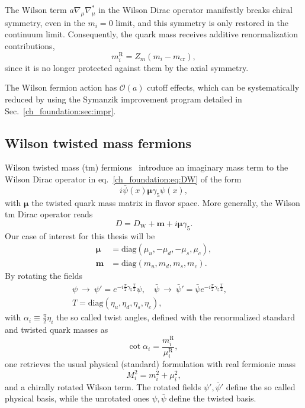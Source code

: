 The Wilson term $a\nabla_{\mu}\nabla_{\mu}^*$ in the Wilson Dirac operator manifestly breaks chiral symmetry, even in the $m_i=0$ limit, and this symmetry is only restored in the continuum limit. Consequently, the quark mass receives additive renormalization contributions, 
\begin{equation}
m_i^{\textrm{R}}=Z_m\left(m_i-m_{\textrm{cr}}\right),
\end{equation}
since it is no longer protected against them by the axial symmetry.

The Wilson fermion action has $\mathcal{O}(a)$ cutoff effects, which can be systematically reduced by using the Symanzik improvement program detailed in Sec.~\ref{ch_foundation:sec:impr}.


\subsection{Wilson twisted mass fermions}
\label{ch_foundation:subsec:tm}

Wilson twisted mass (tm) fermions~\citep{Frezzotti:1999vv,Frezzotti:2000nk,Frezzotti:2001ea,Frezzotti:2003ni,Shindler:2007vp} introduce an imaginary mass term to the Wilson Dirac operator in eq.~\eqref{ch_foundation:eq:DW} of the form
\begin{equation}
i\bar{\psi}(x)\boldsymbol{\mu}\gamma_5\psi(x),
\end{equation}
with $\boldsymbol{\mu}$ the twisted quark mass matrix in flavor space. More generally, the Wilson tm Dirac operator reads
\begin{equation}
D=D_{\textrm{W}}+\boldsymbol{m}+i\boldsymbol{\mu}\gamma_5.
\end{equation}
Our case of interest for this thesis will be
\begin{align}
\boldsymbol{\mu}&={\textrm{diag}}\left(\mu_u,-\mu_d,-\mu_s,\mu_c\right), \\
\boldsymbol{m}&={\textrm{diag}}\left(m_u,m_d,m_s,m_c\right).
\end{align}
By rotating the fields
\begin{gather}
\label{ch_foundation:eq:chiral_rot}
\psi~\to~\psi' = e^{-i\frac{\pi}{2}\gamma_5 \frac{T}{2}}\psi, \quad
\bar{\psi}~\to~\bar{\psi}' = \bar{\psi} e^{-i\frac{\pi}{2}\gamma_5 \frac{T}{2}}, \quad \\
T = {\textrm{diag}}(\eta_u,\eta_d,\eta_s,\eta_c),
\end{gather}
with $\alpha_i\equiv\frac{\pi}{2}\eta_i$ the so called twist angles, defined with the renormalized standard and twisted quark masses as
\begin{equation}
{\textrm{cot}}\;\alpha_i=\frac{m_i^{\textrm{R}}}{\mu_i^{\textrm{R}}},
\end{equation}
one retrieves the usual physical (standard) formulation with real fermionic mass
\begin{equation}
M_i^2=m_i^2+\mu_i^2,
\end{equation}
and a chirally rotated Wilson term. The rotated fields $\psi',\bar{\psi}'$ define the so called physical basis, while the unrotated ones $\psi,\bar{\psi}$ define the twisted basis.

